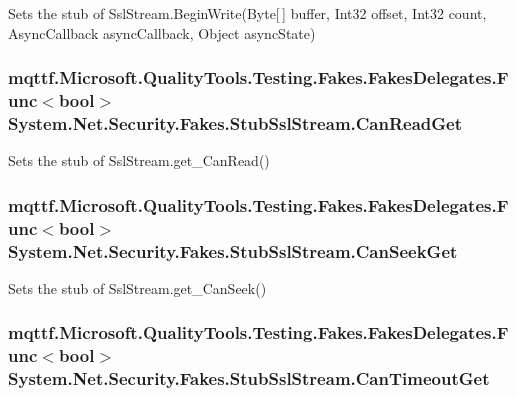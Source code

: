 Sets the stub of Ssl\-Stream.\-Begin\-Write(\-Byte\mbox{[}$\,$\mbox{]} buffer, Int32 offset, Int32 count, Async\-Callback async\-Callback, Object async\-State)

\hypertarget{class_system_1_1_net_1_1_security_1_1_fakes_1_1_stub_ssl_stream_a229bc4ef34ae9c8c02ee9aa2d465a40b}{
\subsubsection[{Can\-Read\-Get}]{\setlength{\rightskip}{0pt plus 5cm}mqttf.\-Microsoft.\-Quality\-Tools.\-Testing.\-Fakes.\-Fakes\-Delegates.\-Func$<$bool$>$ System.\-Net.\-Security.\-Fakes.\-Stub\-Ssl\-Stream.\-Can\-Read\-Get}}\label{class_system_1_1_net_1_1_security_1_1_fakes_1_1_stub_ssl_stream_a229bc4ef34ae9c8c02ee9aa2d465a40b}


Sets the stub of Ssl\-Stream.\-get\-\_\-\-Can\-Read()

\hypertarget{class_system_1_1_net_1_1_security_1_1_fakes_1_1_stub_ssl_stream_a1d61f8cb762faf404b80da67517edb97}{
\subsubsection[{Can\-Seek\-Get}]{\setlength{\rightskip}{0pt plus 5cm}mqttf.\-Microsoft.\-Quality\-Tools.\-Testing.\-Fakes.\-Fakes\-Delegates.\-Func$<$bool$>$ System.\-Net.\-Security.\-Fakes.\-Stub\-Ssl\-Stream.\-Can\-Seek\-Get}}\label{class_system_1_1_net_1_1_security_1_1_fakes_1_1_stub_ssl_stream_a1d61f8cb762faf404b80da67517edb97}


Sets the stub of Ssl\-Stream.\-get\-\_\-\-Can\-Seek()

\hypertarget{class_system_1_1_net_1_1_security_1_1_fakes_1_1_stub_ssl_stream_a8f384ee7195337012410a38f7fd4f5e7}{
\subsubsection[{Can\-Timeout\-Get}]{\setlength{\rightskip}{0pt plus 5cm}mqttf.\-Microsoft.\-Quality\-Tools.\-Testing.\-Fakes.\-Fakes\-Delegates.\-Func$<$bool$>$ System.\-Net.\-Security.\-Fakes.\-Stub\-Ssl\-Stream.\-Can\-Timeout\-Get}}\label{class_system_1_1_net_1_1_security_1_1_fakes_1_1_stub_ssl_stream_a8f384ee7195337012410a38f7fd4f5e7}



